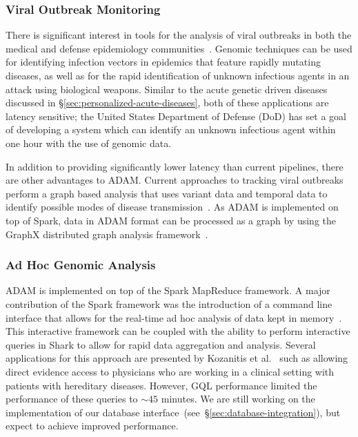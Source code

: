 \documentclass[10pt,twocolumn]{article}
\theoremstyle{plain}
\begin{document}
\subsubsection{Viral Outbreak Monitoring}
\label{sec:viral-outbreak-monitoring}

There is significant interest in tools for the analysis of viral outbreaks in both the medical and defense epidemiology
communities~\cite{snitkin12,beard08}. Genomic techniques can be used for identifying infection vectors in epidemics that
feature rapidly mutating diseases, as well as for the rapid identification of unknown infectious agents in an attack using
biological weapons. Similar to the acute genetic driven diseases discussed in \S\ref{sec:personalized-acute-diseases}, both
of these applications are latency sensitive; the United States Department of Defense (DoD) has set a goal of developing a
system which can identify an unknown infectious agent within one hour with the use of genomic data.

In addition to providing significantly lower latency than current pipelines, there are other advantages to ADAM. Current
approaches to tracking viral outbreaks perform a graph based analysis that uses variant data and temporal data to identify
possible modes of disease transmission~\cite{snitkin12}. As ADAM is implemented on top of Spark, data in ADAM format
can be processed as a graph by using the GraphX distributed graph analysis framework~\cite{xin13}.

\subsubsection{Ad Hoc Genomic Analysis}
\label{sec:ad-hoc-genomic-analysis}

ADAM is implemented on top of the Spark MapReduce framework. A major contribution of the Spark framework was the introduction
of a command line interface that allows for the real-time ad hoc analysis of data kept in memory~\cite{zaharia12}. This interactive
framework can be coupled with the ability to perform interactive queries in Shark to allow for rapid data aggregation and analysis.
Several applications for this approach are presented by Kozanitis et al.~\cite{kozanitis13} such as allowing direct evidence access
to physicians who are working in a clinical setting with patients with hereditary diseases. However, GQL performance limited the
performance of these queries to $\sim45$ minutes. We are still working on the implementation of our database
interface~(see~\S\ref{sec:database-integration}), but expect to achieve improved performance.
\end{document}
